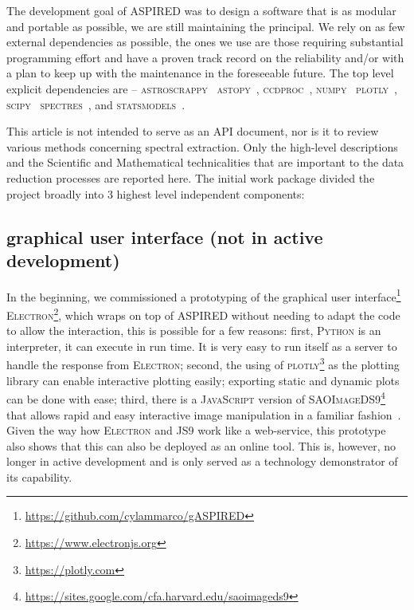 \documentclass[fleqn,usenatbib]{mnras}
\begin{document}
The development goal of ASPIRED was to design a software that is as modular and
portable as possible, we are still maintaining the principal. We rely on as few
external dependencies as possible, the ones we use are those requiring substantial
programming effort and have a proven track record on the reliability and/or
with a plan to keep up with the maintenance  in the foreseeable future. The top
level explicit dependencies are --
\textsc{astroscrappy}~\citep{curtis_mccully_2018_1482019, 2001PASP..113.1420V}
\textsc{astopy}~\citep{astropy:2013, astropy:2018},
\textsc{ccdproc}~\citep{matt_craig_2017_1069648},
\textsc{numpy}~\citep{2020NumPy-Array}
\textsc{plotly}~\citep{plotly},
\textsc{scipy}~\citep{2020SciPy-NMeth}
\textsc{spectres}~\citep{2017arXiv170505165C}, and
\textsc{statsmodels}~\citep{seabold2010statsmodels}. 

This article is not intended to serve as an API document, nor is it to review
various methods concerning spectral extraction. Only the high-level
descriptions and the Scientific and Mathematical technicalities that are
important to the data reduction processes are reported here. The initial
work package divided the project broadly into 3 highest level independent
components:

\subsection*{graphical user interface (not in active development)}
In the beginning, we commissioned a prototyping of the graphical user
interface\footnote{\url{https://github.com/cylammarco/gASPIRED}}
\textsc{Electron}\footnote{\url{https://www.electronjs.org}}, which wraps on top of
\textsc{ASPIRED} without needing to adapt the code to allow the interaction, this is
possible for a few reasons: first, \textsc{Python} is an interpreter, it can execute
in run time. It is very easy to run itself as a server to handle the response from 
\textsc{Electron}; second, the using of
\textsc{plotly}\footnote{\url{https://plotly.com}} as the plotting
library can enable interactive plotting easily; exporting static and dynamic plots
can be done with ease; third, there is a \textsc{JavaScript} version of
\textsc{SAOImageDS9}\footnote{\url{https://sites.google.com/cfa.harvard.edu/saoimageds9}}
that allows rapid and easy interactive image manipulation in a familiar
fashion~\citep{eric_mandel_2021_596052}. Given the way how \textsc{Electron} and
\textsc{JS9} work like a web-service, this prototype also shows that this can also
be deployed as an online tool. This is, however, no longer in active development
and is only served as a technology demonstrator of its capability.
\end{document}
